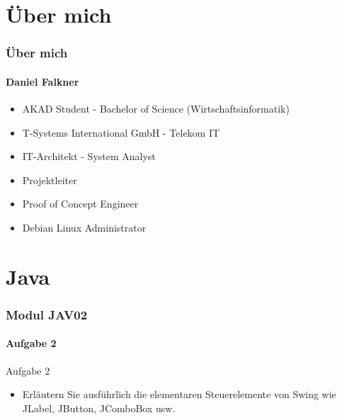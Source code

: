 \documentclass[xcolor=dvipsnames]{beamer}
\subtitle{Modul JAV02} %
\institute{AKAD University} %
\title{\Title}
\author{\Author}
\date{05/06.September.2014}
\begin{document}
\begin{frame}
    \titlepage
\end{frame}




\section{Über mich}
\begin{frame} %
  \frametitle{Über mich} %
  \framesubtitle{Daniel Falkner} %
  \begin{block}{}
	  \begin{itemize}
	  	\item AKAD Student - Bachelor of Science (Wirtschaftsinformatik)
  		\item T-Systems International GmbH - Telekom IT
  		\item IT-Architekt - System Analyst
		\item Projektleiter
		\item Proof of Concept Engineer
  		\item Debian Linux Administrator
	  \end{itemize}
  \end{block}
\end{frame}


\section{Java}
\begin{frame} %
  \frametitle{Modul JAV02} %
  \framesubtitle{Aufgabe 2} %
  \begin{block}{Aufgabe 2}
	  \begin{itemize}
		\item Erläutern Sie ausführlich die elementaren Steuerelemente von Swing wie JLabel, JButton, JComboBox usw.
	  \end{itemize}

  \end{block}
\end{frame}
\end{document}
